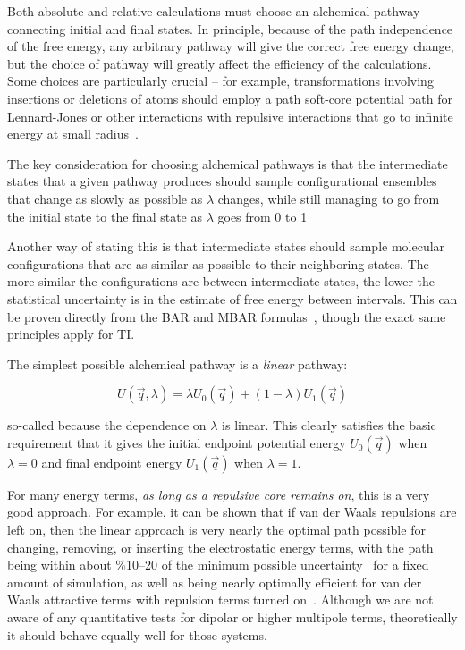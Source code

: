 \documentclass[9pt,bestpractices]{livecoms}
\begin{document}
Both absolute and relative calculations must choose an alchemical pathway connecting initial and final states. In principle, because of the path independence of the free energy, any arbitrary pathway will give the correct free energy change, but the choice of pathway will greatly affect the efficiency of the calculations. 
Some choices are particularly crucial -- for example, transformations involving insertions or deletions of atoms should employ a path soft-core potential path for Lennard-Jones or other interactions with repulsive interactions that go to infinite energy at small radius~\cite{}. 

The key consideration for choosing alchemical pathways is that the intermediate states that a given pathway produces should sample configurational ensembles that change as slowly as possible as $\lambda$ changes, while still managing to go from the initial state to the final state as $\lambda$ goes from 0 to 1

Another way of stating this is that intermediate states should sample molecular configurations that are as similar as possible to their neighboring states. The more similar the configurations are between intermediate states, the lower the statistical uncertainty is in the estimate of free energy between intervals.  This can be proven directly from the BAR and MBAR formulas~\citet{bennett1976efficient,Klimovich:JCAMD:2015}, though the exact same principles apply for TI.

The simplest possible alchemical pathway is a \textit{linear} pathway:

\begin{equation}
U(\vec{q},\lambda) = \lambda U_0(\vec{q}) + (1-\lambda)U_1(\vec{q})    
\end{equation}

so-called because the dependence on $\lambda$ is linear. This clearly satisfies the basic requirement that it gives the initial endpoint potential energy $U_0(\vec{q})$ when $\lambda=0$ and final endpoint energy $U_1(\vec{q})$ when $\lambda=1$. 

For many energy terms, \textit{as long as a repulsive core remains on}, this is a very good approach.  For example, it can be shown that if van der Waals repulsions are left on, then the linear approach is very nearly the optimal path  possible for changing, removing, or inserting the electrostatic energy terms, with the path being within about \%10--20 of the minimum possible uncertainty~\cite{Naden:JCTC:2015} for a fixed amount of simulation, as well as being nearly optimally efficient for van der Waals attractive terms with repulsion terms turned on~\cite{Naden:JCTC:2014}. Although we are not aware of any quantitative tests for dipolar or higher multipole terms, theoretically it should behave equally well for those systems.
\end{document}
